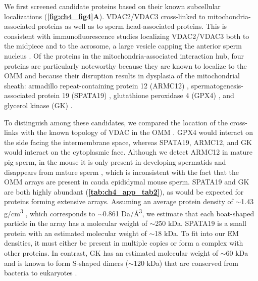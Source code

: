 We first screened candidate proteins based on their known subcellular localizations (\textbf{\autoref{fig:ch4_fig4}A}). VDAC2/VDAC3 cross-linked to mitochondria-associated proteins as well as to sperm head-associated proteins. This is consistent with immunofluorescence studies localizing VDAC2/VDAC3 both to the midpiece and to the acrosome, a large vesicle capping the anterior sperm nucleus \cite{Kwon2013, Hinsch2004, Arcelay2008}. Of the proteins in the mitochondria-associated interaction hub, four proteins are particularly noteworthy because they are known to localize to the OMM and because their disruption results in dysplasia of the mitochondrial sheath: armadillo repeat-containing protein 12 (ARMC12) \cite{Shimada2021}, spermatogenesis-associated protein 19 (SPATA19) \cite{Mi2015}, glutathione peroxidase 4 (GPX4) \cite{Schneider2009, Imai2009}, and glycerol kinase (GK) \cite{Chen2017a, Shimada2019}.

To distinguish among these candidates, we compared the location of the cross-links with the known topology of VDAC in the OMM \cite{Tomasello2013, Bayrhuber2008}. GPX4 would interact on the side facing the intermembrane space, whereas SPATA19, ARMC12, and GK would interact on the cytoplasmic face. Although we detect ARMC12 in mature pig sperm, in the mouse it is only present in developing spermatids and disappears from mature sperm \cite{Shimada2021}, which is inconsistent with the fact that the OMM arrays are present in cauda epididymal mouse sperm. SPATA19 and GK are both highly abundant (\textbf{\autoref{tab:ch4_app_tab2}}), as would be expected for proteins forming extensive arrays. Assuming an average protein density of $\sim$1.43 g/cm\textsuperscript{3} \cite{Quillin2000}, which corresponds to $\sim$0.861 Da/Å\textsuperscript{3}, we estimate that each boat-shaped particle in the array has a molecular weight of $\sim$250 kDa. SPATA19 is a small protein with an estimated molecular weight of $\sim$18 kDa. To fit into our EM densities, it must either be present in multiple copies or form a complex with other proteins. In contrast, GK has an estimated molecular weight of $\sim$60 kDa and is known to form S-shaped dimers ($\sim$120 kDa) that are conserved from bacteria \cite{Fukuda2016, Bystrom1999} to eukaryotes \cite{Balogun2019, Schnick2009}.

